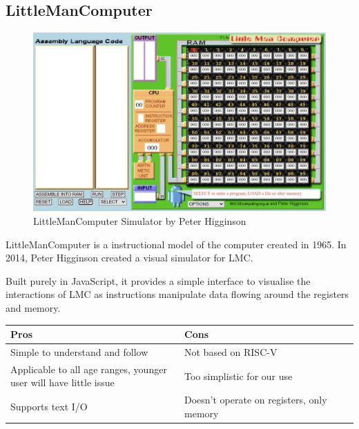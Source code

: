 \subsection{LittleManComputer}\label{sec:lmc}
\begin{figure}[h]
    \centering
    \includegraphics[width=0.75\linewidth]{dissertation/DATA/LMC.jpg}
    \caption{LittleManComputer Simulator by Peter Higginson}
    \label{fig:lmc}
\end{figure}
LittleManComputer \cite{higginson_2014_little} is a instructional model of the computer created in 1965. In 2014, Peter Higginson created a visual simulator \cite{higginson_2014_little} for LMC.

Built purely in JavaScript, it provides a simple interface to visualise the interactions of LMC as instructions manipulate data flowing around the registers and memory.

\begin{table}[h]
\begin{tabular}{|p{0.5\linewidth} | p{0.5\linewidth}|}\hline
\textbf{Pros}                                                     & \textbf{Cons}                             \\\hline
Simple to understand and follow                                   & Not based on RISC-V                       \\\hline
Applicable to all age ranges, younger user will have little issue & Too simplistic for our use                \\\hline
Supports text I/O                                                 & Doesn't operate on registers, only memory \\\hline
\end{tabular}
\end{table}

